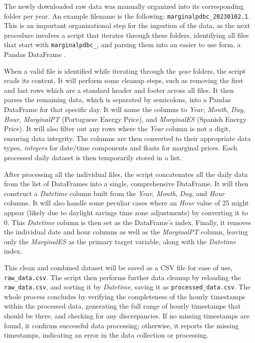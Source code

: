 \documentclass[12pt]{report} %
\begin{document}
The newly downloaded raw data was manually organized into its corresponding folder per year. An example filename is the following: \small{\verb|marginalpdbc_20230102.1|}. This is an important organizational step for the ingestion of the data, as the next procedure involves a script that iterates through these folders, identifying all files that start with \small{\verb|marginalpdbc_|}, and parsing them into an easier to use form, a Pandas DataFrame \cite{dataframe}.

When a valid file is identified while iterating through the \textit{year} folders, the script reads its content. It will perform some cleanup steps, such as removing the first and last rows which are a standard header and footer across all files. It then parses the remaining data, which is separated by semicolons, into a Pandas DataFrame for that specific day. It will name the columns to \textit{Year}, \textit{Month}, \textit{Day}, \textit{Hour}, \textit{MarginalPT} (Portuguese Energy Price), and \textit{MarginalES} (Spanish Energy Price). It will also filter out any rows where the \textit{Year} column is not a digit, ensuring data integrity. The columns are then converted to their appropriate data types, \textit{integers} for date/time components and \textit{}{floats} for marginal prices. Each processed daily dataset is then temporarily stored in a list.

After processing all the individual files, the script concatenates all the daily data from the list of DataFrames into a single, comprehensive DataFrame. It will then construct a \textit{Datetime} column built from the \textit{Year}, \textit{Month}, \textit{Day}, and \textit{Hour} columns. It will also handle some peculiar cases where an \textit{Hour} value of 25 might appear (likely due to daylight savings time zone adjustments) by converting it to 0. This \textit{Datetime} column is then set as the DataFrame's index. Finally, it removes the individual date and hour columns as well as the \textit{MarginalPT} column, leaving only the \textit{MarginalES} as the primary target variable, along with the \textit{Datetime} index.

This clean and combined dataset will be saved as a CSV file for ease of use, \small{\verb|raw_data.csv|}. The script then performs further data cleanup by reloading the \small{\verb|raw_data.csv|}, and sorting it by \textit{Datetime}, saving it as \small{\verb|processed_data.csv|}. The whole process concludes by verifying the completeness of the hourly timestamps within the processed data, generating the full range of hourly timestamps that should be there, and checking for any discrepancies. If no missing timestamps are found, it confirms successful data processing; otherwise, it reports the missing timestamps, indicating an error in the data collection or processing.
\end{document}
